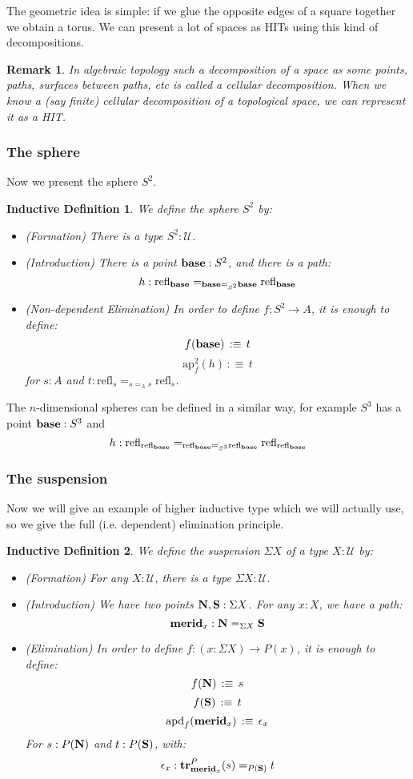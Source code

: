 \documentclass{article}
\newcommand{\ssse}[1]{\subsubsection*{#1}}
\newcommand{\U}{{\mathcal U}}
\renewcommand{\r}{\rightarrow}
\newcommand{\ap}{\mathrm{ap}}
\newcommand{\apd}{\mathrm{apd}}
\newcommand{\refl}{\mathrm{refl}}
\newcommand{\tr}{\mathrm{\bf tr}}
\newcommand{\base}{\mathrm{\bf base}}
\newcommand{\N}{\mathrm{\bf N}}
\renewcommand{\S}{\mathrm{\bf S}}
\newcommand{\merid}{\mathrm{\bf merid}}
\newtheorem{remark}{Remark}
\newtheorem{ind_def}{Inductive Definition}
\begin{document}
The geometric idea is simple: if we glue the opposite edges of a square together we obtain a torus. We can present a lot of spaces as HITs using this kind of decompositions.

\begin{remark}
In algebraic topology such a decomposition of a space as some points, paths, surfaces between paths, etc is called a cellular decomposition. When we know a (say finite) cellular decomposition of a topological space, we can represent it as a HIT.
\end{remark}

\ssse{The sphere}

Now we present the sphere $S^2$.

\begin{ind_def}
We define the sphere $S^2$ by:
\begin{itemize}
\item (Formation) There is a type $S^2:\U$.
\item (Introduction) There is a point $\base:S^2$, and there is a path:
\[h:\refl_\base =_{\base=_{S^2}\base}\refl_\base\]
\item (Non-dependent Elimination) In order to define $f:S^2\r A$, it is enough to define:
\[f(\base)\, :\equiv\, t\]
\[\ap^2_f(h) \, :\equiv\, t\]
for $s:A$ and $t:\refl_s=_{s=_As}\refl_s$.
\end{itemize}
\end{ind_def}

The $n$-dimensional spheres can be defined in a similar way, for example $S^3$ has a point $\base:S^3$ and 
\[h:\refl_{\refl_\base} =_{\refl_\base =_{S^3}\refl_\base} \refl_{\refl_\base}\]



\ssse{The suspension}

Now we will give an example of higher inductive type which we will actually use, so we give the full (i.e. dependent) elimination principle.

\begin{ind_def}
We define the suspension $\Sigma X$ of a type $X:\U$ by:
\begin{itemize}
\item (Formation) For any $X:\U$, there is a type $\Sigma X : \U$.
\item (Introduction) We have two points $\N,\S : \Sigma X$. For any $x:X$, we have a path:
\[\merid_x : \N=_{\Sigma X}\S\]
\item (Elimination) In order to define $f:(x:\Sigma X)\r P(x)$, it is enough to define:
\[f(\N) \, :\equiv\, s\]
\[f(\S)\, :\equiv\, t\]
\[\apd_f(\merid_x) \, :\equiv\, \epsilon_x\]
For $s:P(\N)$ and $t:P(\S)$, with:
\[\epsilon_x : \tr^P_{\merid_x}(s) =_{P(\S)} t\] 
\end{itemize}
\end{ind_def}
\end{document}
